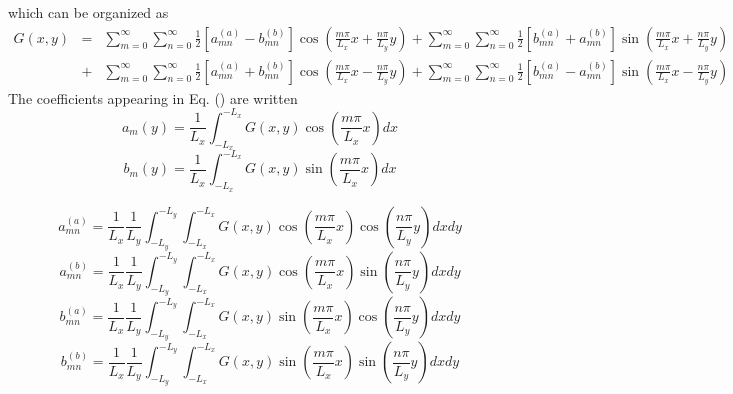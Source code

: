 \documentclass{article}
\begin{document}
which can be organized as
\begin{eqnarray}
  G (x, y) & = & \sum_{m = 0}^{\infty} \sum_{n = 0}^{\infty} \frac{1}{2} [a_{m
  n}^{(a)} - b_{m n}^{(b)}] \cos \left( \frac{m \pi}{L_x} x + \frac{n
  \pi}{L_y} y \right) + \sum_{m = 0}^{\infty} \sum_{n = 0}^{\infty}
  \frac{1}{2} [b_{m n}^{(a)} + a_{m n}^{(b)}] \sin \left( \frac{m \pi}{L_x} x
  + \frac{n \pi}{L_y} y \right) \nonumber\\
  & + & \sum_{m = 0}^{\infty} \sum_{n = 0}^{\infty} \frac{1}{2} [a_{m
  n}^{(a)} + b_{m n}^{(b)}] \cos \left( \frac{m \pi}{L_x} x - \frac{n
  \pi}{L_y} y \right) + \sum_{m = 0}^{\infty} \sum_{n = 0}^{\infty}
  \frac{1}{2} [b_{m n}^{(a)} - a_{m n}^{(b)}] \sin \left( \frac{m \pi}{L_x} x
  - \frac{n \pi}{L_y} y \right)  \label{11-9-4}
\end{eqnarray}
The coefficients appearing in Eq. () are written
\begin{equation}
  a_m (y) = \frac{1}{L_x} \int_{- L_x}^{- L_x} G (x, y) \cos \left( \frac{m
  \pi}{L_x} x \right) d x
\end{equation}
\begin{equation}
  b_m (y) = \frac{1}{L_x} \int_{- L_x}^{- L_x} G (x, y) \sin \left( \frac{m
  \pi}{L_x} x \right) d x
\end{equation}

\begin{equation}
  a_{m n}^{(a)} = \frac{1}{L_x}  \frac{1}{L_y} \int_{- L_y}^{- L_y} \int_{-
  L_x}^{- L_x} G (x, y) \cos \left( \frac{m \pi}{L_x} x \right) \cos \left(
  \frac{n \pi}{L_y} y \right) d x d y
\end{equation}
\begin{equation}
  a_{m n}^{(b)} = \frac{1}{L_x}  \frac{1}{L_y} \int_{- L_y}^{- L_y} \int_{-
  L_x}^{- L_x} G (x, y) \cos \left( \frac{m \pi}{L_x} x \right) \sin \left(
  \frac{n \pi}{L_y} y \right) d x d y
\end{equation}
\begin{equation}
  b_{m n}^{(a)} = \frac{1}{L_x} \frac{1}{L_y} \int_{- L_y}^{- L_y} \int_{-
  L_x}^{- L_x} G (x, y) \sin \left( \frac{m \pi}{L_x} x \right) \cos \left(
  \frac{n \pi}{L_y} y \right) d x d y
\end{equation}
\begin{equation}
  b_{m n}^{(b)} = \frac{1}{L_x} \frac{1}{L_y} \int_{- L_y}^{- L_y} \int_{-
  L_x}^{- L_x} G (x, y) \sin \left( \frac{m \pi}{L_x} x \right) \sin \left(
  \frac{n \pi}{L_y} y \right) d x d y
\end{equation}
\end{document}
